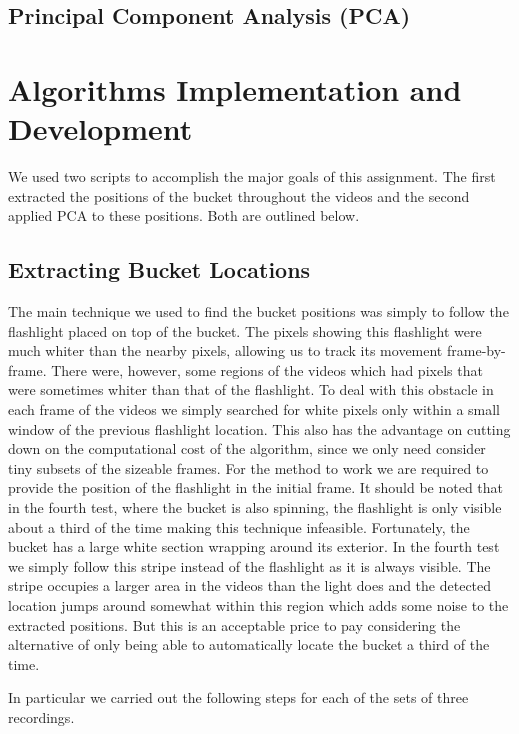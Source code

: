 \documentclass[fleqn,10pt]{../SelfArx} %
\begin{document}
\subsection{Principal Component Analysis (PCA)}



\section{Algorithms Implementation and Development} %
\label{sec:algorithm_implementation_and_development}
We used two scripts to accomplish the major goals of this assignment. The first extracted the positions of the bucket throughout the videos and the second applied PCA to these positions. Both are outlined below.

\subsection{Extracting Bucket Locations}
The main technique we used to find the bucket positions was simply to follow the flashlight placed on top of the bucket. The pixels showing this flashlight were much whiter than the nearby pixels, allowing us to track its movement frame-by-frame. There were, however, some regions of the videos which had pixels that were sometimes whiter than that of the flashlight. To deal with this obstacle in each frame of the videos we simply searched for white pixels only within a small window of the previous flashlight location. This also has the advantage on cutting down on the computational cost of the algorithm, since we only need consider tiny subsets of the sizeable frames. For the method to work we are required to provide the position of the flashlight in the initial frame. It should be noted that in the fourth test, where the bucket is also spinning, the flashlight is only visible about a third of the time making this technique infeasible. Fortunately, the bucket has a large white section wrapping around its exterior. In the fourth test we simply follow this stripe instead of the flashlight as it is always visible. The stripe occupies a larger area in the videos than the light does and the detected location jumps around somewhat within this region which adds some noise to the extracted positions. But this is an acceptable price to pay considering the alternative of only being able to automatically locate the bucket a third of the time.

In particular we carried out the following steps for each of the sets of three recordings.
\end{document}
